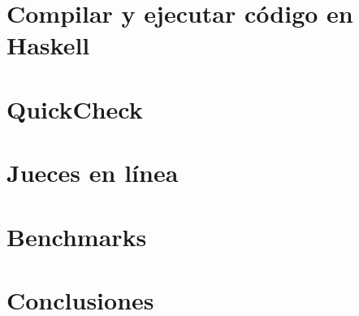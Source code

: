 \documentclass{book}
\begin{document}
    \chapter{Compilar y ejecutar código en Haskell}
        

    \chapter{QuickCheck}
        

    \chapter{Jueces en línea}
        

    \chapter{Benchmarks}
        
    
    \chapter{Conclusiones}
        


\backmatter
    \nocite{*}
    \printbibliography
\end{document}
